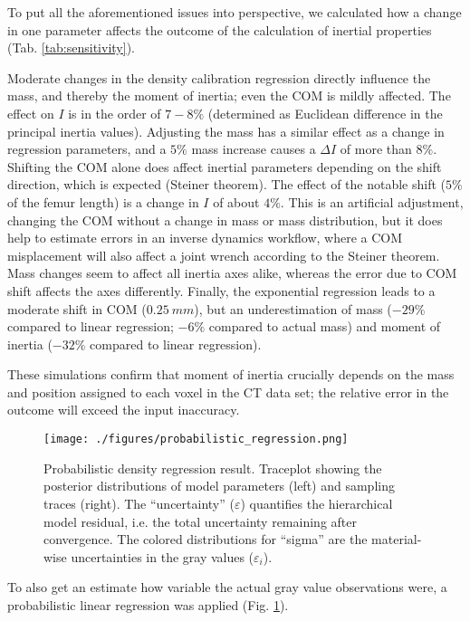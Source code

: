 To put all the aforementioned issues into perspective, we calculated how a change in one parameter affects the outcome of the calculation of inertial properties (Tab. \ref{tab:sensitivity}).

Moderate changes in the density calibration regression directly influence the mass, and thereby the moment of inertia; even the COM is mildly affected.
The effect on \(I\) is in the order of \(7-8 \%\) (determined as Euclidean difference in the principal inertia values).
Adjusting the mass has a similar effect as a change in regression parameters, and a \(5 \%\) mass increase causes a \(\Delta I\) of more than \(8 \%\).
Shifting the COM alone does affect inertial parameters depending on the shift direction, which is expected (Steiner theorem).
The effect of the notable shift (\(5 \%\) of the femur length) is a change in \(I\) of about \(4 \%\).
This is an artificial adjustment, changing the COM without a change in mass or mass distribution, but it does help to estimate errors in an inverse dynamics workflow, where a COM misplacement will also affect a joint wrench according to the Steiner theorem.
Mass changes seem to affect all inertia axes alike, whereas the error due to COM shift affects the axes differently.
Finally, the exponential regression leads to a moderate shift in COM (\(0.25\ mm\)), but an underestimation of mass (\(-29 \%\) compared to linear regression; \(-6 \%\) compared to actual mass) and moment of inertia (\(-32 \%\) compared to linear regression).

These simulations confirm that moment of inertia crucially depends on the mass and position assigned to each voxel in the CT data set; the relative error in the outcome will exceed the input inaccuracy.


\begin{figure}[p]
\centering
\texttt{[image: ./figures/probabilistic\_regression.png]}
\caption{\label{fig:probabilistic_density}Probabilistic density regression result. Traceplot showing the posterior distributions of model parameters (left) and sampling traces (right). The ``uncertainty'' (\(\varepsilon\)) quantifies the hierarchical model residual, i.e. the total uncertainty remaining after convergence. The colored distributions for ``sigma'' are the material-wise uncertainties in the gray values (\(\varepsilon_{i}\)).}
\end{figure}

\bigskip
To also get an estimate how variable the actual gray value observations were, a probabilistic linear regression was applied (Fig. \ref{fig:probabilistic_density}).

